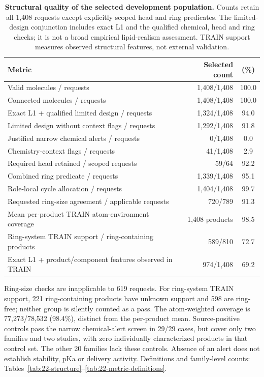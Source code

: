 \begin{table}[H]
\caption{\textbf{Structural quality of the selected development population.}
Counts retain all 1,408 requests except explicitly scoped head and ring predicates. The limited-design
conjunction includes exact L1 and the qualified chemical, head and ring checks; it is not a broad
empirical lipid-realism assessment. TRAIN support measures observed structural features, not external validation.}
\label{tab:22-quality-metrics}\centering\footnotesize
\setlength{\tabcolsep}{3pt}\renewcommand{\arraystretch}{1.12}
\begin{tabular}{@{}>{\raggedright\arraybackslash}p{}rc@{}}\toprule
Metric & Selected count & (\%)\\\midrule
Valid molecules / requests & 1,408/1,408 & 100.0 \\
Connected molecules / requests & 1,408/1,408 & 100.0 \\
Exact L1 + qualified limited design / requests & 1,324/1,408 & 94.0 \\
Limited design without context flags / requests & 1,292/1,408 & 91.8 \\
Justified narrow chemical alerts / requests & 0/1,408 & 0.0 \\
Chemistry-context flags / requests & 41/1,408 & 2.9 \\
Required head retained / scoped requests & 59/64 & 92.2 \\
Combined ring predicate / requests & 1,339/1,408 & 95.1 \\
Role-local cycle allocation / requests & 1,404/1,408 & 99.7 \\
Requested ring-size agreement / applicable requests & 720/789 & 91.3 \\
Mean per-product TRAIN atom-environment coverage & 1,408 products & 98.5 \\
Ring-system TRAIN support / ring-containing products & 589/810 & 72.7 \\
Exact L1 + product/component features observed in TRAIN & 974/1,408 & 69.2 \\
\bottomrule\end{tabular}
\par\smallskip\raggedright\scriptsize
Ring-size checks are inapplicable to 619 requests. For ring-system TRAIN support, 221 ring-containing
products have unknown support and 598 are ring-free; neither group is silently counted as a pass.
The atom-weighted coverage is 77,273/78,532 (98.4\%), distinct from the per-product mean.
Source-positive controls pass the narrow chemical-alert screen in 29/29 cases, but cover only two families
and two studies, with zero individually characterized products in that control set. The other 20
families lack these controls. Absence of an alert does not establish stability, pKa or delivery activity.
Definitions and family-level counts: Tables~\ref{tab:22-structure}--\ref{tab:22-metric-definitions}.
\end{table}

